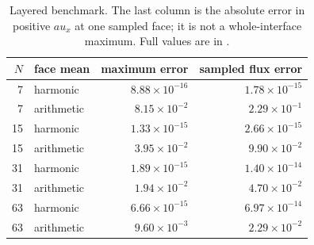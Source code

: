 \begin{table}[htbp]
\centering
\small
\setlength{\tabcolsep}{4pt}
\begin{tabular}{rlrr}
\toprule
$N$ & face mean & maximum error & sampled flux error \\
\midrule
7 & harmonic & $8.88\times10^{-16}$ & $1.78\times10^{-15}$ \\
7 & arithmetic & $8.15\times10^{-2}$ & $2.29\times10^{-1}$ \\
15 & harmonic & $1.33\times10^{-15}$ & $2.66\times10^{-15}$ \\
15 & arithmetic & $3.95\times10^{-2}$ & $9.90\times10^{-2}$ \\
31 & harmonic & $1.89\times10^{-15}$ & $1.40\times10^{-14}$ \\
31 & arithmetic & $1.94\times10^{-2}$ & $4.70\times10^{-2}$ \\
63 & harmonic & $6.66\times10^{-15}$ & $6.97\times10^{-14}$ \\
63 & arithmetic & $9.60\times10^{-3}$ & $2.29\times10^{-2}$ \\
\bottomrule
\end{tabular}
\caption{Layered benchmark. The last column is the absolute error in positive $a u_x$ at one sampled face; it is not a whole-interface maximum. Full values are in .}
\label{tab:variable-layered}
\end{table}
